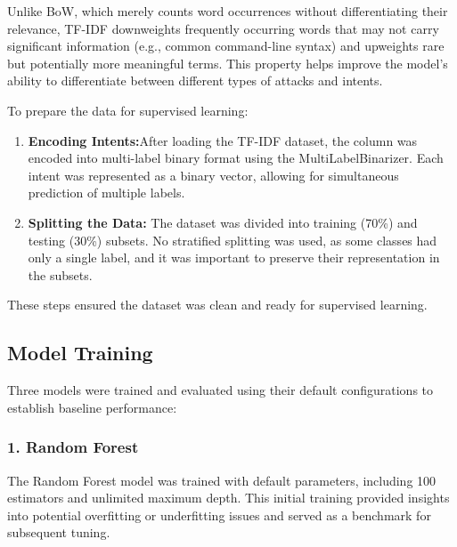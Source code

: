         Unlike BoW, which merely counts word occurrences without differentiating their relevance, TF-IDF downweights frequently occurring words that may not carry significant information (e.g., common command-line syntax) and upweights rare but potentially more meaningful terms. This property helps improve the model's ability to differentiate between different types of attacks and intents.
    
        To prepare the data for supervised learning:

        \begin{enumerate}
    
            \item \textbf{Encoding Intents:}After loading the TF-IDF dataset, the  column was encoded into multi-label binary format using the MultiLabelBinarizer. Each intent was represented as a binary vector, allowing for simultaneous prediction of multiple labels.
            
            \item \textbf{Splitting the Data:} The dataset was divided into training (70\%) and testing (30\%) subsets. No stratified splitting was used, as some classes had only a single label, and it was important to preserve their representation in the subsets.
        
        \end{enumerate}

        These steps ensured the dataset was clean and ready for supervised learning.

    \subsection{Model Training}
    
        Three models were trained and evaluated using their default configurations to establish baseline performance:

        \subsubsection*{1. Random Forest \\}
        
        
            The Random Forest model was trained with default parameters, including 100 estimators and unlimited maximum depth. This initial training provided insights into potential overfitting or underfitting issues and served as a benchmark for subsequent tuning.

